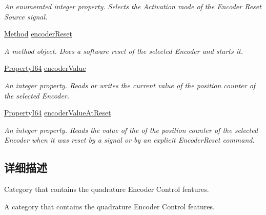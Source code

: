 \begin{DoxyCompactItemize}
\begin{DoxyCompactList}\small\item\em An enumerated integer property. Selects the Activation mode of the Encoder Reset Source signal. \end{DoxyCompactList}\item 
\hyperlink{classmv_i_m_p_a_c_t_1_1acquire_1_1_method}{Method} \hyperlink{classmv_i_m_p_a_c_t_1_1acquire_1_1_gen_i_cam_1_1_encoder_control_a09291b0a28dfba6043befecf136894cc}{encoder\+Reset}
\begin{DoxyCompactList}\small\item\em A method object. Does a software reset of the selected Encoder and starts it. \end{DoxyCompactList}\item 
\hyperlink{group___common_interface_ga81749b2696755513663492664a18a893}{Property\+I64} \hyperlink{classmv_i_m_p_a_c_t_1_1acquire_1_1_gen_i_cam_1_1_encoder_control_a155593f156aca42831131b788eb25b63}{encoder\+Value}
\begin{DoxyCompactList}\small\item\em An integer property. Reads or writes the current value of the position counter of the selected Encoder. \end{DoxyCompactList}\item 
\hyperlink{group___common_interface_ga81749b2696755513663492664a18a893}{Property\+I64} \hyperlink{classmv_i_m_p_a_c_t_1_1acquire_1_1_gen_i_cam_1_1_encoder_control_abe3354fcac087829fe183d54f9a8da19}{encoder\+Value\+At\+Reset}
\begin{DoxyCompactList}\small\item\em An integer property. Reads the value of the of the position counter of the selected Encoder when it was reset by a signal or by an explicit Encoder\+Reset command. \end{DoxyCompactList}\end{DoxyCompactItemize}


\subsection{详细描述}
Category that contains the quadrature Encoder Control features. 

A category that contains the quadrature Encoder Control features. 

